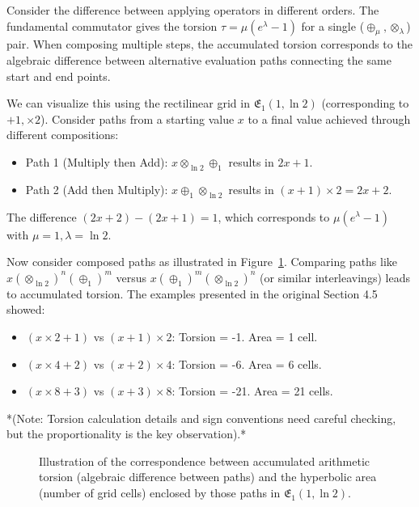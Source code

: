 \documentclass[12pt]{article}
\begin{document}
Consider the difference between applying operators in different orders. The fundamental commutator gives the torsion \( \tau = \mu(e^\lambda - 1) \) for a single (\(\oplus_\mu, \otimes_\lambda\)) pair. When composing multiple steps, the accumulated torsion corresponds to the algebraic difference between alternative evaluation paths connecting the same start and end points.

We can visualize this using the rectilinear grid in \( \mathfrak{E}_1(1, \ln 2) \) (corresponding to \(+1, \times 2\)). Consider paths from a starting value \( x \) to a final value achieved through different compositions:
\begin{itemize}
    \item Path 1 (Multiply then Add): \( x \otimes_{\ln 2} \oplus_1 \) results in \( 2x + 1 \).
    \item Path 2 (Add then Multiply): \( x \oplus_1 \otimes_{\ln 2} \) results in \( (x+1) \times 2 = 2x + 2 \).
\end{itemize}
The difference \( (2x+2) - (2x+1) = 1 \), which corresponds to \( \mu(e^\lambda-1) \) with \( \mu=1, \lambda=\ln 2 \).

Now consider composed paths as illustrated in Figure~\ref{fig:area-formula_cs}. Comparing paths like \( x (\otimes_{\ln 2})^n (\oplus_1)^m \) versus \( x (\oplus_1)^m (\otimes_{\ln 2})^n \) (or similar interleavings) leads to accumulated torsion. The examples presented in the original Section 4.5 showed:
\begin{itemize}
    \item \( (x \times 2 + 1) \) vs \( (x+1) \times 2 \): Torsion = -1. Area = 1 cell.
    \item \( (x \times 4 + 2) \) vs \( (x+2) \times 4 \): Torsion = -6. Area = 6 cells.
    \item \( (x \times 8 + 3) \) vs \( (x+3) \times 8 \): Torsion = -21. Area = 21 cells.
\end{itemize}
*(Note: Torsion calculation details and sign conventions need careful checking, but the proportionality is the key observation).*

\begin{figure}[ht]
    \centering
    \caption{Illustration of the correspondence between accumulated arithmetic torsion (algebraic difference between paths) and the hyperbolic area (number of grid cells) enclosed by those paths in \( \mathfrak{E}_1(1, \ln 2) \).}
    \label{fig:area-formula_cs}
\end{figure}
\end{document}
